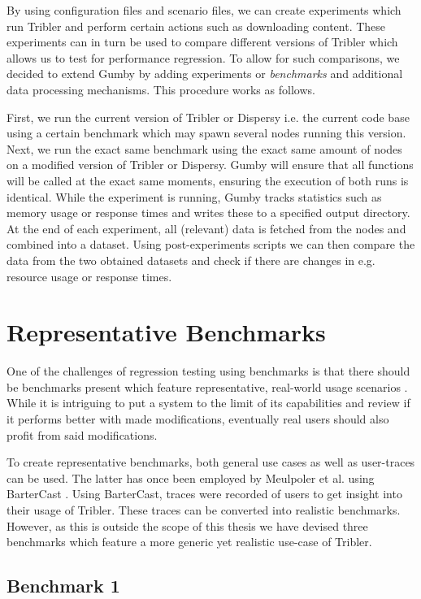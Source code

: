 By using configuration files and scenario files, we can create experiments which run Tribler and perform certain actions such as downloading content.
These experiments can in turn be used to compare different versions of Tribler which allows us to test for performance regression. 
To allow for such comparisons, we decided to extend Gumby by adding experiments or \emph{benchmarks} and additional data processing mechanisms.
This procedure works as follows.

First, we run the current version of Tribler or Dispersy i.e. the current code base using a certain benchmark which may spawn several nodes running this version.
Next, we run the exact same benchmark using the exact same amount of nodes on a modified version of Tribler or Dispersy.
Gumby will ensure that all functions will be called at the exact same moments, ensuring the execution of both runs is identical.
While the experiment is running, Gumby tracks statistics such as memory usage or response times and writes these to a specified output directory.
At the end of each experiment, all (relevant) data is fetched from the nodes and combined into a dataset.
Using post-experiments scripts we can then compare the data from the two obtained datasets and check if there are changes in e.g. resource usage or response times.

\section{Representative Benchmarks}

One of the challenges of regression testing using benchmarks is that there should be benchmarks present which feature representative, real-world usage scenarios \cite{ferre2001usability}.
While it is intriguing to put a system to the limit of its capabilities and review if it performs better with made modifications, eventually real users should also profit from said modifications.

To create representative benchmarks, both general use cases as well as user-traces can be used.
The latter has once been employed by Meulpoler et al. using BarterCast \cite{meulpolder2009bartercast}.
Using BarterCast, traces were recorded of users to get insight into their usage of Tribler.
These traces can be converted into realistic benchmarks.
However, as this is outside the scope of this thesis we have devised three benchmarks which feature a more generic yet realistic use-case of Tribler.

\subsection{Benchmark 1}

